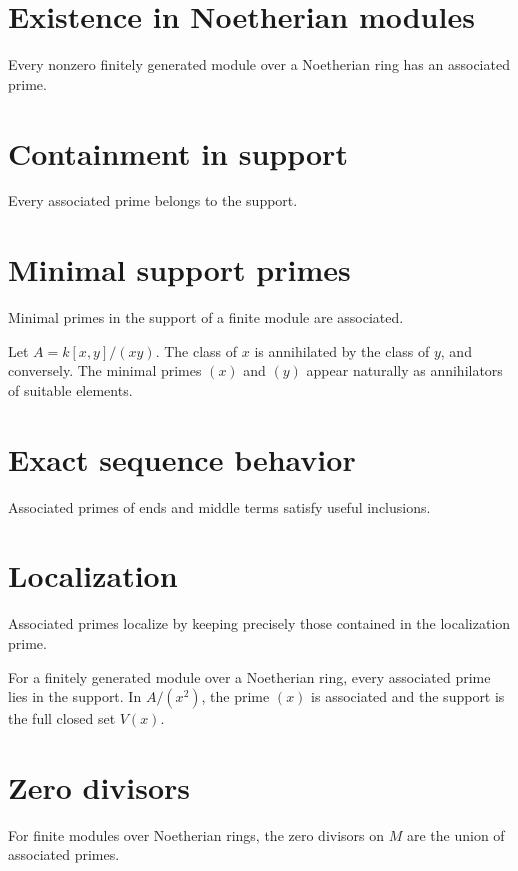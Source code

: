 \section{Existence in Noetherian modules}
Every nonzero finitely generated module over a Noetherian ring has an associated prime.

\section{Containment in support}
Every associated prime belongs to the support.

\section{Minimal support primes}
Minimal primes in the support of a finite module are associated.

\begin{example}\label{ex:v17-expand-02}
Let $A=k[x,y]/(xy)$. The class of $x$ is annihilated by the class of $y$, and conversely. The minimal primes $(x)$ and $(y)$ appear naturally as annihilators of suitable elements.
\end{example}
\section{Exact sequence behavior}
Associated primes of ends and middle terms satisfy useful inclusions.

\section{Localization}
Associated primes localize by keeping precisely those contained in the localization prime.

\begin{example}\label{ex:v17-expand-03}
For a finitely generated module over a Noetherian ring, every associated prime lies in the support. In $A/(x^2)$, the prime $(x)$ is associated and the support is the full closed set $V(x)$.
\end{example}
\section{Zero divisors}
For finite modules over Noetherian rings, the zero divisors on $M$ are the union of associated primes.

